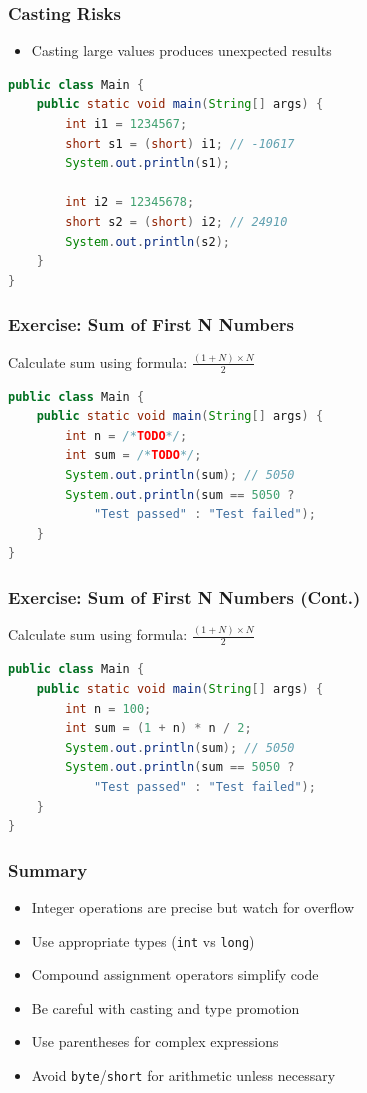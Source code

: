\documentclass[serif, aspectratio=169]{beamer}
\begin{document}
\begin{frame}[fragile]
\frametitle{Casting Risks}
\begin{itemize}
    \item Casting large values produces unexpected results
\end{itemize}
\begin{lstlisting}[language=Java]
public class Main {
    public static void main(String[] args) {
        int i1 = 1234567;
        short s1 = (short) i1; // -10617
        System.out.println(s1);
        
        int i2 = 12345678;
        short s2 = (short) i2; // 24910
        System.out.println(s2);
    }
}
\end{lstlisting}
\end{frame}

\begin{frame}[fragile]
\frametitle{Exercise: Sum of First N Numbers}
Calculate sum using formula: $\frac{(1+N) \times N}{2}$
\begin{lstlisting}[language=Java]
public class Main {
    public static void main(String[] args) {
        int n = /*TODO*/;
        int sum = /*TODO*/;
        System.out.println(sum); // 5050
        System.out.println(sum == 5050 ? 
            "Test passed" : "Test failed");
    }
}
\end{lstlisting}
\end{frame}

\begin{frame}[fragile]
\frametitle{Exercise: Sum of First N Numbers (Cont.)}
Calculate sum using formula: $\frac{(1+N) \times N}{2}$
\begin{lstlisting}[language=Java]
public class Main {
    public static void main(String[] args) {
        int n = 100;
        int sum = (1 + n) * n / 2;
        System.out.println(sum); // 5050
        System.out.println(sum == 5050 ? 
            "Test passed" : "Test failed");
    }
}
\end{lstlisting}
\end{frame}

\begin{frame}[fragile]
\frametitle{Summary}
\begin{itemize}
    \item Integer operations are precise but watch for overflow
    \item Use appropriate types (\texttt{int} vs \texttt{long})
    \item Compound assignment operators simplify code
    \item Be careful with casting and type promotion
    \item Use parentheses for complex expressions
    \item Avoid \texttt{byte}/\texttt{short} for arithmetic unless necessary
\end{itemize}
\end{frame}
\end{document}
